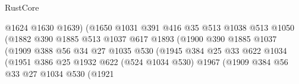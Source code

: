 \begin{lexlean}{RustCore}
\begin{coremodule}
                                        @1624
                                        @1630
                                        @1639)
                                      (@1650
                                        @1031
                                        @391
                                        @416
                                        @35
                                        @513
                                        @1038
                                        @513
                                        @1050
                                        (@1882
                                          @390
                                          @1885
                                          @513
                                          @1037
                                          @617
                                          @1893
                                          (@1900
                                            @390
                                            @1885
                                            @1037
                                            (@1909
                                              @388
                                              @56
                                              @34
                                              @27
                                              @1035
                                              @530
                                              (@1945
                                                @384
                                                @25
                                                @33
                                                @622
                                                @1034
                                                (@1951
                                                  @386
                                                  @25
                                                  @1932
                                                  @622
                                                  (@524 @1034 @530)
                                                  @1967
                                                  (@1909
                                                    @384
                                                    @56
                                                    @33
                                                    @27
                                                    @1034
                                                    @530
                                                    (@1921

\end{coremodule}
\end{lexlean}
